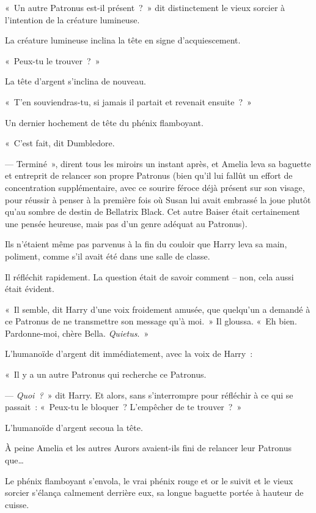 «~Un autre Patronus est-il présent~?~»
dit distinctement le vieux sorcier à l'intention de la créature lumineuse.

La créature lumineuse inclina la tête en signe d'acquiescement.

«~Peux-tu le trouver~?~»

La tête d'argent s'inclina de nouveau.

«~T'en souviendras-tu, si jamais il partait et revenait ensuite~?~»

Un dernier hochement de tête du phénix flamboyant.

«~C'est fait, dit Dumbledore.

--- Terminé~», dirent tous les miroirs un instant après, et Amelia leva sa baguette et entreprit de relancer son propre Patronus (bien qu'il lui fallût un effort de concentration supplémentaire, avec ce sourire féroce déjà présent sur son visage, pour réussir à penser à la première fois où Susan lui avait embrassé la joue plutôt qu'au sombre de destin de Bellatrix Black.
Cet autre Baiser était certainement une pensée heureuse, mais pas d'un genre adéquat au Patronus).

\later

Ils n'étaient même pas parvenus à la fin du couloir que Harry leva sa main, poliment, comme s'il avait été dans une salle de classe.

Il réfléchit rapidement.
La question était de savoir comment -- non, cela aussi était évident.

«~Il semble, dit Harry d'une voix froidement amusée, que quelqu'un a demandé à ce Patronus de ne transmettre son message qu'à moi.~»
Il gloussa.
«~Eh bien.
Pardonne-moi, chère Bella.
\emph{Quietus}.~»

L'humanoïde d'argent dit immédiatement, avec la voix de Harry~:

«~Il y a un autre Patronus qui recherche ce Patronus.

--- \emph{Quoi~?}~» dit Harry.
Et alors, sans s'interrompre pour réfléchir à ce qui se passait~: «~Peux-tu le bloquer~?
L'empêcher de te trouver~?~»

L'humanoïde d'argent secoua la tête.

\later

À peine Amelia et les autres Aurors avaient-ils fini de relancer leur Patronus que…

Le phénix flamboyant s'envola, le vrai phénix rouge et or le suivit et le vieux sorcier s'élança calmement derrière eux, sa longue baguette portée à hauteur de cuisse.

